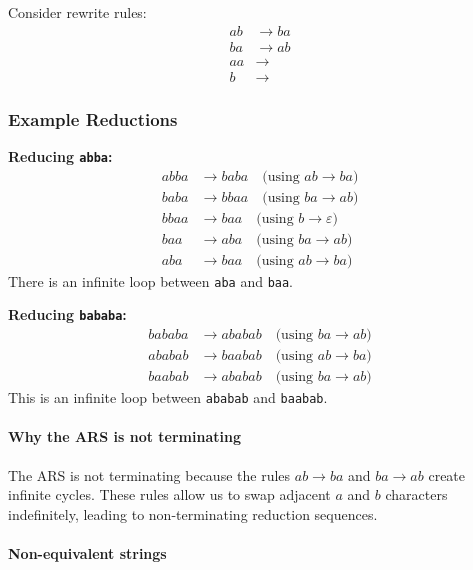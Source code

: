 \documentclass{article}
\theoremstyle{theorem}
\theoremstyle{definition}
\theoremstyle{remark}
\begin{document}
Consider rewrite rules:
\begin{align*}
ab &\rightarrow ba \\
ba &\rightarrow ab \\
aa &\rightarrow\\
b &\rightarrow
\end{align*}

 
\subsubsection*{Example Reductions}


\textbf{Reducing \texttt{abba}:}
\begin{align*}
abba &\rightarrow baba \quad \text{(using } ab \rightarrow ba\text{)} \\
baba &\rightarrow bbaa \quad \text{(using } ba \rightarrow ab\text{)} \\
bbaa &\rightarrow baa \quad \text{(using } b \rightarrow \varepsilon\text{)} \\
baa &\rightarrow aba \quad \text{(using } ba \rightarrow ab\text{)} \\
aba &\rightarrow baa \quad \text{(using } ab \rightarrow ba\text{)}
\end{align*}
There is an infinite loop between \texttt{aba} and \texttt{baa}.

\textbf{Reducing \texttt{bababa}:}
\begin{align*}
bababa &\rightarrow ababab \quad \text{(using } ba \rightarrow ab\text{)} \\
ababab &\rightarrow baabab \quad \text{(using } ab \rightarrow ba\text{)} \\
baabab &\rightarrow ababab \quad \text{(using } ba \rightarrow ab\text{)}
\end{align*}
This is an infinite loop between \texttt{ababab} and \texttt{baabab}.

\paragraph{Why the ARS is not terminating}

The ARS is not terminating because the rules $ab \rightarrow ba$ and $ba \rightarrow ab$ create infinite cycles. These rules allow us to swap adjacent $a$ and $b$ characters indefinitely, leading to non-terminating reduction sequences.

\paragraph{Non-equivalent strings}
\end{document}
